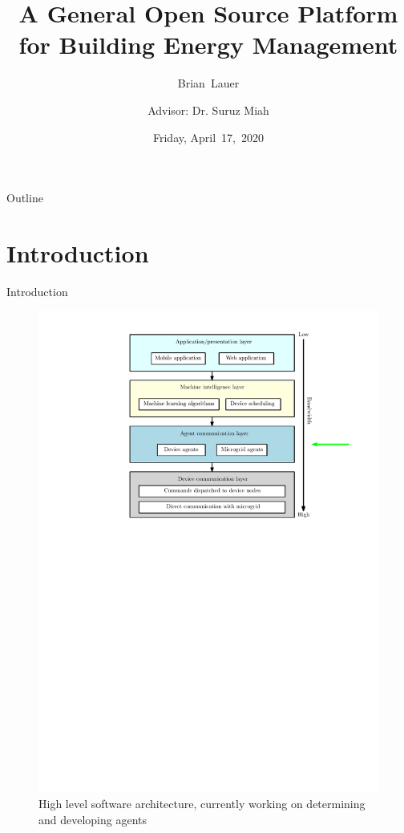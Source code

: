 \documentclass{beamer}
\title[Progress Update]{A General Open Source Platform for Building Energy Management}
\author[B.~Lauer]{Brian~Lauer\\\and
Advisor: Dr. Suruz Miah}
\institute[Bradley University] %
{
  Department of Electrical and Computer Engineering\\
  Bradley University\\
  1501 W. Bradley Avenue\\
  Peoria, IL, 61625, USA
}
\date[Friday~17,~2020]{Friday, April~17,~2020}
\begin{document}
\begin{frame}
  \titlepage
\end{frame}

\begin{frame}{Outline}
  \tableofcontents
\end{frame}


\section{Introduction}
\begin{frame}{Introduction}
\begin{figure}
\includegraphics[scale=0.43]{figs/ipe/BEMS-softwareArchitectureAgents}
\caption{High level software architecture, currently working on determining and developing agents}
\end{figure}
\end{frame}
\end{document}
